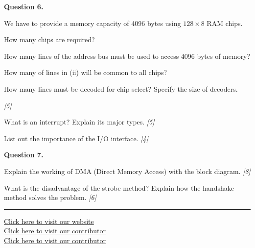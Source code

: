 \documentclass[11pt,a4paper]{article}
\newcommand{\pts}[1]{\hfill   \textit{[#1]}}
\begin{document}
\medskip


\noindent   \textbf{Question 6.}

\begin{parts}
  \item We have to provide a memory capacity of 4096 bytes using $128  \times 8$ RAM chips.
  
\begin{parts}
    \item How many chips are required?
    \item How many lines of the address bus must be used to access 4096 bytes of memory?
    \item How many of lines in (ii) will be common to all chips?
    \item How many lines must be decoded for chip select? Specify the size of decoders.
  \end{parts} \pts{5}
  \item What is an interrupt? Explain its major types. \pts{5}
  \item List out the importance of the I/O interface. \pts{4}
\end{parts}

\medskip


\noindent   \textbf{Question 7.}

\begin{parts}
  \item Explain the working of DMA (Direct Memory Access) with the block diagram. \pts{8}
  \item What is the disadvantage of the strobe method? Explain how the handshake method solves the problem. \pts{6}
\end{parts}

\vfill
\rule{\linewidth}{0.4pt}

\begin{center}\small
\href{https://bhu-exam.vercel.app/}{Click here to visit our website}\\[4pt]\href{https://me-aryan.vercel.app/}{Click here to visit our contributor}\\[4pt]\href{https://quashan-me.vercel.app/}{Click here to visit our contributor}
\end{center}
\end{document}
